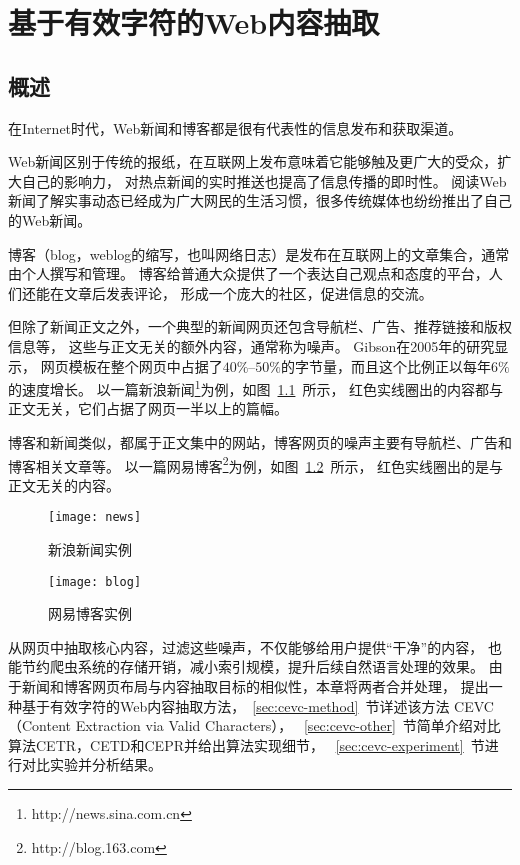 
\chapter{基于有效字符的Web内容抽取}

\section{概述}
\label{sec:cevc-intro}
在Internet时代，Web新闻和博客都是很有代表性的信息发布和获取渠道。

Web新闻区别于传统的报纸，在互联网上发布意味着它能够触及更广大的受众，扩大自己的影响力，
对热点新闻的实时推送也提高了信息传播的即时性。
阅读Web新闻了解实事动态已经成为广大网民的生活习惯，很多传统媒体也纷纷推出了自己的Web新闻。

博客（blog，weblog的缩写，也叫网络日志）是发布在互联网上的文章集合，通常由个人撰写和管理。
博客给普通大众提供了一个表达自己观点和态度的平台，人们还能在文章后发表评论，
形成一个庞大的社区，促进信息的交流。

但除了新闻正文之外，一个典型的新闻网页还包含导航栏、广告、推荐链接和版权信息等，
这些与正文无关的额外内容，通常称为噪声。
Gibson在2005年的研究\cite{gibson2005volume}显示，
网页模板在整个网页中占据了$40\%$--$50\%$的字节量，而且这个比例正以每年$6\%$的速度增长。
以一篇新浪新闻\footnote{http://news.sina.com.cn}为例，如图~\ref{fig:news}~所示，
红色实线圈出的内容都与正文无关，它们占据了网页一半以上的篇幅。

博客和新闻类似，都属于正文集中的网站，博客网页的噪声主要有导航栏、广告和博客相关文章等。
以一篇网易博客\footnote{http://blog.163.com}为例，如图~\ref{fig:blog}~所示，
红色实线圈出的是与正文无关的内容。

\begin{figure}[htbp]
\centering
\texttt{[image: news]}
\caption{新浪新闻实例}
\label{fig:news}
\end{figure}

\begin{figure}[htbp]
\centering
\texttt{[image: blog]}
\caption{网易博客实例}
\label{fig:blog}
\end{figure}

从网页中抽取核心内容，过滤这些噪声，不仅能够给用户提供“干净”的内容，
也能节约爬虫系统的存储开销，减小索引规模，提升后续自然语言处理的效果。
由于新闻和博客网页布局与内容抽取目标的相似性，本章将两者合并处理，
提出一种基于有效字符的Web内容抽取方法，~\ref{sec:cevc-method}~节详述该方法
CEVC（Content Extraction via Valid Characters），
~\ref{sec:cevc-other}~节简单介绍对比算法CETR，CETD和CEPR并给出算法实现细节，
~\ref{sec:cevc-experiment}~节进行对比实验并分析结果。

